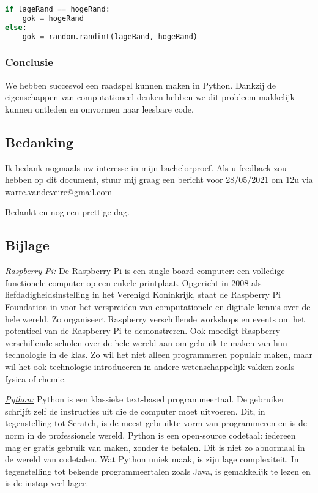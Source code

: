\begin{lstlisting}[language=Python, caption=Volledige uitwerking van het raadspel in Python]
if lageRand == hogeRand:
    gok = hogeRand
else:
    gok = random.randint(lageRand, hogeRand)
\end{lstlisting}

\subsubsection{Conclusie}
We hebben succesvol een raadspel kunnen maken in Python. Dankzij de eigenschappen van computationeel denken hebben we dit probleem makkelijk kunnen ontleden en omvormen naar leesbare code.

\subsection{Bedanking}
Ik bedank nogmaals uw interesse in mijn bachelorproef. Als u feedback zou hebben op dit document, stuur mij graag een bericht voor 28/05/2021 om 12u via warre.vandeveire@gmail.com 

Bedankt en nog een prettige dag.

\subsection{Bijlage}
\emph{\underline{Raspberry Pi:}} 
De Raspberry Pi is een single board computer: een volledige functionele computer op een enkele printplaat.
Opgericht in 2008 als liefdadigheidsinstelling in het Verenigd Koninkrijk, staat de Raspberry Pi Foundation in voor het verspreiden van computationele en digitale kennis over de hele wereld. Zo organiseert Raspberry verschillende workshops en events om het potentieel van de Raspberry Pi te demonstreren.
Ook moedigt Raspberry verschillende scholen over de hele wereld aan om gebruik te maken van hun technologie in de klas. Zo wil het niet alleen programmeren populair maken, maar wil het ook technologie introduceren in andere wetenschappelijk vakken zoals fysica of chemie.

\emph{\underline{Python:}}
Python is een klassieke text-based programmeertaal. De gebruiker schrijft zelf de instructies uit die de computer moet uitvoeren. Dit, in tegenstelling tot Scratch, is de meest gebruikte vorm van programmeren en is de norm in de professionele wereld. Python is een open-source codetaal: iedereen mag er gratis gebruik van maken, zonder te betalen.
Dit is niet zo abnormaal in de wereld van codetalen. Wat Python uniek maak, is zijn lage complexiteit. In tegenstelling tot bekende programmeertalen zoals Java, is gemakkelijk te lezen en is de instap veel lager.


